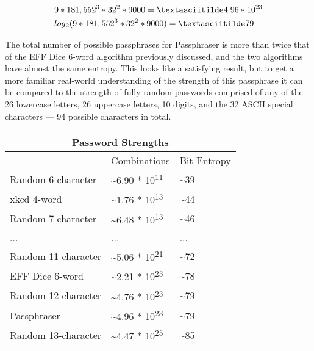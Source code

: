 \documentclass[
	a4paper, %
	10pt, %
	unnumberedsections, %
	twoside, %
]{LTJournalArticle}
\begin{document}
\begin{align*}
	& 9 * 181,552\textsuperscript{3} * 32\textsuperscript{2} * 9000 = \textasciitilde4.96 * 10\textsuperscript{23} \\
	& log\textsubscript{2}(9 * 181,552\textsuperscript{3} * 32\textsuperscript{2} * 9000) = \textasciitilde79
\end{align*}

The total number of possible passphrases for Passphraser is more than twice that of the EFF Dice 6-word algorithm previously discussed, and the two algorithms have almost the same entropy. This looks like a satisfying result, but to get a more familiar real-world understanding of the strength of this passphrase it can be compared to the strength of fully-random passwords comprised of any of the 26 lowercase letters, 26 uppercase letters, 10 digits, and the 32 ASCII special characters --- 94 possible characters in total.

\begin{table}[h] %
	\centering
	\begin{tabular}{l l l}
		\multicolumn{3}{c}{Password Strengths} \\
		\midrule
		& Combinations & Bit Entropy \\
		\cmidrule(l){2-3}
		Random 6-character & \textasciitilde6.90 * 10\textsuperscript{11} & \textasciitilde39 \\
		xkcd 4-word & \textasciitilde1.76 * 10\textsuperscript{13} & \textasciitilde44 \\
		Random 7-character & \textasciitilde6.48 * 10\textsuperscript{13} & \textasciitilde46 \\
		... & ... & ... \\
		Random 11-character & \textasciitilde5.06 * 10\textsuperscript{21} & \textasciitilde72 \\
		EFF Dice 6-word & \textasciitilde2.21 * 10\textsuperscript{23} & \textasciitilde78 \\
		Random 12-character & \textasciitilde4.76 * 10\textsuperscript{23} & \textasciitilde79 \\
		Passphraser & \textasciitilde4.96 * 10\textsuperscript{23} & \textasciitilde79 \\
		Random 13-character & \textasciitilde4.47 * 10\textsuperscript{25} & \textasciitilde85 \\
	\end{tabular}
	\label{tab:passwordstrengths}
\end{table}
\end{document}
